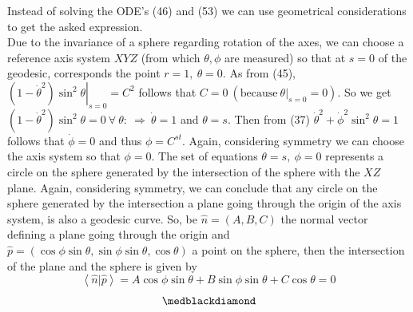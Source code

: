 Instead of solving the ODE's (46) and (53) we can use geometrical considerations to get the asked expression.\\ Due to the invariance of a sphere regarding rotation of the axes, we can choose a reference axis system $XYZ$ (from which $\theta, \phi$ are measured) so that at $s=0$ of the geodesic,  corresponds the point $r=1, \ \theta = 0$. As  from (45),  $\left.(1-\dot{\theta}^2)\sin^2\theta \right |_{s=0} = C^2$ follows that $C=0 \ (\text{because} \ \left.\theta \right |_{s=0} = 0)$. So we get $(1-\dot{\theta}^2)\sin^2\theta  = 0 \ \forall \ \theta : \ \Rightarrow \ \dot{\theta} = 1$ and  $\theta =s$. Then from (37) $\dot{\theta}^2+\dot{\phi}^2\sin^2\theta = 1$  follows that $\dot{\phi}= 0$ and thus $\phi = C^{st}$. Again, considering symmetry we can choose the axis system so that $\phi = 0$. The set of equations $ \theta =s, \ \phi = 0$ represents a circle on the sphere generated by the intersection of the sphere with the $XZ$ plane. Again, considering symmetry, we can conclude that any circle on the sphere generated by the intersection a plane going through the origin of the axis system, is also a geodesic curve. So, be $\widehat{n} = (A,B,C)$ the normal vector defining a plane going through the origin and $\widehat{p} = (\cos\phi \sin\theta,\sin\phi \sin\theta,\cos\theta)$ a point on the sphere, then the intersection of the plane and the sphere is given by $$\left<\widehat{n} | \widehat{p}\right> = A\cos\phi \sin\theta+ B\sin\phi \sin\theta+ C\cos\theta = 0$$
$$\medblackdiamond$$
\newpage

